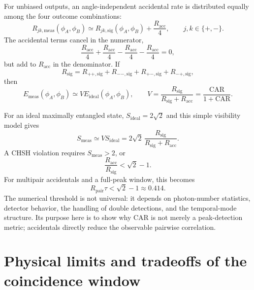 \documentclass[a4paper,10pt]{article}
\begin{document}
For unbiased outputs, an angle-independent accidental rate is distributed equally among the four outcome combinations:
\begin{equation}
    R_{jk,\mathrm{meas}}(\phi_A,\phi_B)
    \simeq R_{jk,\mathrm{sig}}(\phi_A,\phi_B)
    +\frac{R_{\mathrm{acc}}}{4},
    \qquad j,k\in\{+,-\}.
\end{equation}
The accidental terms cancel in the numerator,
\begin{equation}
    \frac{R_{\mathrm{acc}}}{4}
    +\frac{R_{\mathrm{acc}}}{4}
    -\frac{R_{\mathrm{acc}}}{4}
    -\frac{R_{\mathrm{acc}}}{4}=0,
\end{equation}
but add to $R_{\mathrm{acc}}$ in the denominator.  If
\begin{equation}
    R_{\mathrm{sig}}
    =R_{++,\mathrm{sig}}+R_{--,\mathrm{sig}}
     +R_{+-,\mathrm{sig}}+R_{-+,\mathrm{sig}},
\end{equation}
then
\begin{equation}
    E_{\mathrm{meas}}(\phi_A,\phi_B)
    \simeq V E_{\mathrm{ideal}}(\phi_A,\phi_B),
    \qquad
    V=\frac{R_{\mathrm{sig}}}{R_{\mathrm{sig}}+R_{\mathrm{acc}}}
     =\frac{\mathrm{CAR}}{1+\mathrm{CAR}}.
\end{equation}

For an ideal maximally entangled state, $S_{\mathrm{ideal}}=2\sqrt{2}$ and this simple visibility model gives
\begin{equation}
    S_{\mathrm{meas}}
    \simeq V S_{\mathrm{ideal}}
    =2\sqrt{2}\,
     \frac{R_{\mathrm{sig}}}{R_{\mathrm{sig}}+R_{\mathrm{acc}}}.
\end{equation}
A CHSH violation requires $S_{\mathrm{meas}}>2$, or
\begin{equation}
    \label{eq:bell-car-threshold}
    \frac{R_{\mathrm{acc}}}{R_{\mathrm{sig}}}
    <\sqrt{2}-1.
\end{equation}
For multipair accidentals and a full-peak window, this becomes
\begin{equation}
    R_{\mathrm{pair}}\tau
    <\sqrt{2}-1
    \approx0.414.
\end{equation}
The numerical threshold is not universal: it depends on photon-number statistics, detector behavior, the handling of double detections, and the temporal-mode structure.  Its purpose here is to show why CAR is not merely a peak-detection metric; accidentals directly reduce the observable pairwise correlation.

\section{Physical limits and tradeoffs of the coincidence window}
\label{sec:optimization}
\end{document}
